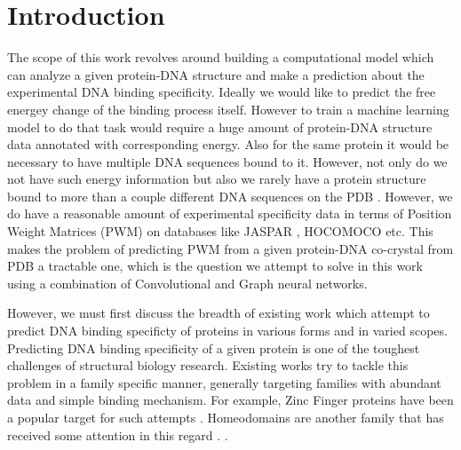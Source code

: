 \section{Introduction} 

The scope of this work revolves around building a computational model which can analyze a given
protein-DNA structure and make a prediction about the experimental DNA binding specificity. Ideally we
would like to predict the free energey change of the binding process itself. However to train a
machine learning model to do that task would require a huge amount of protein-DNA
structure data annotated with corresponding energy. Also for the same protein it would be necessary
to have multiple DNA sequences bound to it. However, not only do we not have such energy information
but also we rarely have a protein structure bound to more than a couple different DNA sequences on
the PDB \citep{berman2000protein}. However, we do have a reasonable amount of experimental
specificity data in terms of Position Weight Matrices (PWM) on databases like
JASPAR \citep{fornes2020jaspar}, HOCOMOCO \citep{kulakovskiy2018hocomoco} etc. This makes the problem of predicting PWM from
a given protein-DNA co-crystal from PDB a tractable one, which is the question we attempt to solve
in this work using a combination of Convolutional and Graph neural networks.

However, we must first discuss the breadth of existing work which attempt to predict DNA binding
specificty of proteins in various forms and in varied scopes. Predicting DNA binding specificity
of a given protein is one of the toughest challenges of structural biology research. Existing works 
try to tackle this problem in a family specific manner, generally targeting families with abundant data 
and simple binding mechanism. For example, Zinc Finger proteins have been a popular target for such attempts
\citep{persikov2009predicting,molparia2010zif, persikov2014novo,
meseguer2020prediction,aizenshtein2022deepzf}. 
Homeodomains are another family that has received some attention in this regard
\citep{noyes2008analysis,christensen2012recognition,wetzel2022learning}. .
\par
\par
\par
